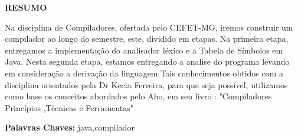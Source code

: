 \begin{center}
\uppercase{\textbf{\large{Resumo}}}
\end{center}
Na disciplina de Compiladores, ofertada pelo CEFET-MG, iremos construir um compilador ao longo do semestre, este, dividido em etapas. Na primeira etapa, entregamos a implementação do analisador léxico e a Tabela de Símbolos em Java. Nesta segunda etapa, estamos entregando a analise do programa levando em consideração a derivação da linguagem.Tais conhecimentos obtidos com a disciplina orientados pela Dr Kecia Ferreira, para que seja possível, utilizamos como base os conceitos abordados pelo Aho, em seu livro : "Compiladores Princípios ,Técnicas e Ferramentas"
\vspace{2cm}

\textbf{Palavras Chaves:} java,compilador

\vfill
\clearpage